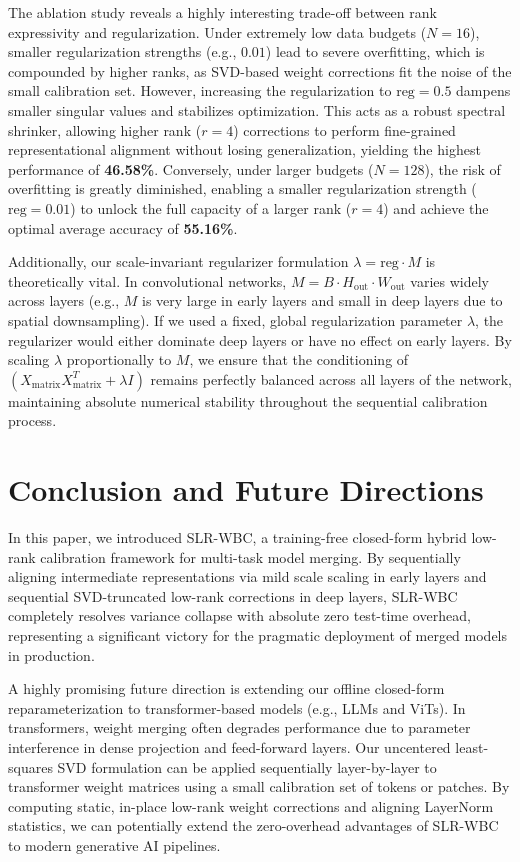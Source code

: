 \documentclass{article}
\theoremstyle{plain}
\theoremstyle{definition}
\theoremstyle{remark}
\begin{document}
The ablation study reveals a highly interesting trade-off between rank expressivity and regularization. Under extremely low data budgets ($N=16$), smaller regularization strengths (e.g., $0.01$) lead to severe overfitting, which is compounded by higher ranks, as SVD-based weight corrections fit the noise of the small calibration set. However, increasing the regularization to $\text{reg}=0.5$ dampens smaller singular values and stabilizes optimization. This acts as a robust spectral shrinker, allowing higher rank ($r=4$) corrections to perform fine-grained representational alignment without losing generalization, yielding the highest performance of \textbf{46.58\%}. Conversely, under larger budgets ($N=128$), the risk of overfitting is greatly diminished, enabling a smaller regularization strength ($\text{reg}=0.01$) to unlock the full capacity of a larger rank ($r=4$) and achieve the optimal average accuracy of \textbf{55.16\%}.

Additionally, our scale-invariant regularizer formulation $\lambda = \text{reg} \cdot M$ is theoretically vital. In convolutional networks, $M = B \cdot H_{\text{out}} \cdot W_{\text{out}}$ varies widely across layers (e.g., $M$ is very large in early layers and small in deep layers due to spatial downsampling). If we used a fixed, global regularization parameter $\lambda$, the regularizer would either dominate deep layers or have no effect on early layers. By scaling $\lambda$ proportionally to $M$, we ensure that the conditioning of $(X_{\text{matrix}} X_{\text{matrix}}^T + \lambda I)$ remains perfectly balanced across all layers of the network, maintaining absolute numerical stability throughout the sequential calibration process.

\section{Conclusion and Future Directions}
In this paper, we introduced SLR-WBC, a training-free closed-form hybrid low-rank calibration framework for multi-task model merging. By sequentially aligning intermediate representations via mild scale scaling in early layers and sequential SVD-truncated low-rank corrections in deep layers, SLR-WBC completely resolves variance collapse with absolute zero test-time overhead, representing a significant victory for the pragmatic deployment of merged models in production.

A highly promising future direction is extending our offline closed-form reparameterization to transformer-based models (e.g., LLMs and ViTs). In transformers, weight merging often degrades performance due to parameter interference in dense projection and feed-forward layers. Our uncentered least-squares SVD formulation can be applied sequentially layer-by-layer to transformer weight matrices using a small calibration set of tokens or patches. By computing static, in-place low-rank weight corrections and aligning LayerNorm statistics, we can potentially extend the zero-overhead advantages of SLR-WBC to modern generative AI pipelines.
\end{document}

